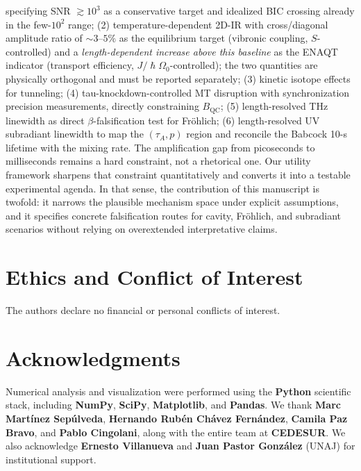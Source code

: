 \documentclass[twocolumn,10pt]{article}
\renewcommand{\hbar}{\hslash}
\begin{document}
specifying SNR $\gtrsim 10^3$ as a conservative target and idealized BIC
crossing already in the few-$10^2$ range; (2) temperature-dependent 2D-IR with cross/diagonal amplitude
ratio of $\sim 3$--$5\%$ as the equilibrium target (vibronic coupling,
$S$-controlled) and a \textit{length-dependent increase above this baseline}
as the ENAQT indicator (transport efficiency, $J/\hbar\Omega_0$-controlled);
the two quantities are physically orthogonal and must be reported separately; (3) kinetic isotope effects for tunneling;
(4) tau-knockdown-controlled MT disruption with synchronization precision
measurements, directly constraining $B_{\text{QC}}$; (5) length-resolved
THz linewidth as direct $\beta$-falsification test for Fr\"ohlich;
(6) length-resolved UV subradiant linewidth to map the $(\tau_A, p)$
region and reconcile the Babcock 10-s lifetime with the mixing rate.
The amplification gap from picoseconds to milliseconds remains a hard
constraint, not a rhetorical one. Our utility framework sharpens that
constraint quantitatively and converts it into a testable experimental
agenda. In that sense, the contribution of this manuscript is twofold:
it narrows the plausible mechanism space under explicit assumptions, and
it specifies concrete falsification routes for cavity, Fr\"ohlich, and
subradiant scenarios without relying on overextended interpretative claims.

\section*{Ethics and Conflict of Interest}
The authors declare no financial or personal conflicts of interest.

\section*{Acknowledgments}
Numerical analysis and visualization were performed using the \textbf{Python} scientific stack, including \textbf{NumPy}, \textbf{SciPy}, \textbf{Matplotlib}, and \textbf{Pandas}. We thank \textbf{Marc Mart\'inez Sep\'ulveda}, \textbf{Hernando Rub\'en Ch\'avez Fern\'andez}, \textbf{Camila Paz Bravo}, and \textbf{Pablo Cingolani}, along with the entire team at \textbf{CEDESUR}. We also acknowledge \textbf{Ernesto Villanueva} and \textbf{Juan Pastor Gonz\'alez} (UNAJ) for institutional support.
\end{document}
